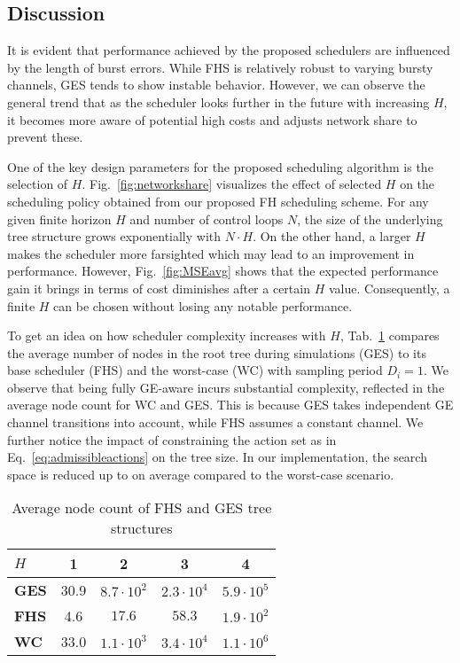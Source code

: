 \subsection{Discussion}

It is evident that performance achieved by the proposed schedulers are
influenced by the length of burst errors. While FHS is relatively robust to
varying bursty channels, GES tends to show instable behavior. However, we can
observe the general trend that as the scheduler looks further in the future with
increasing $H$, it becomes more aware of potential high costs and adjusts
network share to prevent these.

One of the key design parameters for the proposed scheduling algorithm is the
selection of $H$. Fig.~\ref{fig:networkshare} visualizes the effect of selected
$H$ on the scheduling policy obtained from our proposed  FH scheduling scheme.
For any given finite horizon $H$ and number of control loops $N$, the size of
the underlying tree structure grows exponentially with $N\cdot H$. On the other
hand, a larger $H$ makes the scheduler more farsighted which may lead to an
improvement in performance. However, Fig.~\ref{fig:MSEavg} shows that the
expected performance gain it brings in terms of cost diminishes after a certain
$H$ value. Consequently, a finite $H$ can be chosen without losing any notable
performance. 

To get an idea on how scheduler complexity increases with $H$,
Tab.~\ref{tab:complexity} compares the average number of nodes in the root tree
during simulations (GES) to its base scheduler (FHS) and the worst-case (WC)
with sampling period $D_i=1$. We observe that being fully GE-aware incurs
substantial complexity, reflected in the average node count for WC and GES. This
is because GES takes independent GE channel transitions into account, while FHS
assumes a constant channel. We further notice the impact of constraining the
action set as in Eq.~\eqref{eq:admissibleactions} on the tree size. In our
implementation, the search space is reduced up to on average compared to the
worst-case scenario.

\begin{table}[htb]
  \begin{center}
  \begin{tabular}{|l|c|c|c|c|}
  \hline
  $H$ & 1 & 2 & 3 & 4 \\ 
  \hline \hline
  \textbf{GES} & 30.9 & $8.7\cdot10^2$ & $2.3\cdot10^4$ & $5.9\cdot10^5$ \\
  \textbf{FHS} & 4.6 & $17.6$ & $58.3$ & $1.9\cdot10^2$ \\
  \textbf{WC} & 33.0 & $1.1\cdot10^3$ & $3.4\cdot10^4$ & $1.1\cdot10^6$ \\
  \hline
  \end{tabular}
  \caption{Average node count of FHS and GES tree structures}
  \label{tab:complexity}
  \end{center}
\end{table}

